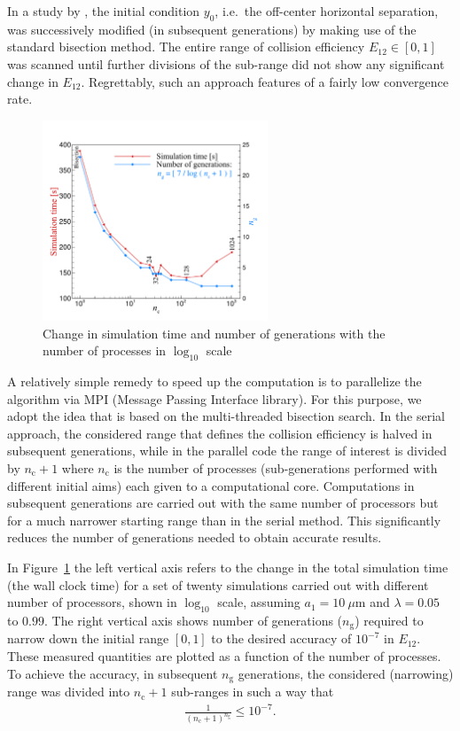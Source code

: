 \documentclass[../thesis.tex]{subfiles}
\begin{document}
In a study by \cite{RWMG11}, the initial condition $y_0$, i.e.\ the off-center horizontal separation, was successively modified (in subsequent generations) by making use of the standard bisection method. The entire range of collision efficiency $E_{12} \in [0, 1]$ was scanned until further divisions of the sub-range did not show any significant change in $E_{12}$. Regrettably, such an approach features of a fairly low convergence rate.

\begin{figure}%
\center
\includegraphics[trim=05mm 00mm 05mm 20mm, clip, width=0.6\textwidth]{../figs/PRF/fig10.pdf}
\caption{Change in simulation time and number of generations with the number of processes in $\log_{10}$ scale}
\label{fig:scal}
\end{figure}%

A relatively simple remedy to speed up the computation is to parallelize the algorithm via MPI (Message Passing Interface library). For this purpose, we adopt the idea that is based on the multi-threaded bisection search. In the serial approach, the considered range that defines the collision efficiency is halved in subsequent generations, while in the parallel code the range of interest is divided by $n_\text{c} + 1$ where $n_\text{c}$ is the number of processes (sub-generations performed with different initial aims) each given to a computational core. Computations in subsequent generations are carried out with the same number of processors but for a much narrower starting range than in the serial method. This significantly reduces the number of generations needed to obtain accurate results.

In Figure~\ref{fig:scal} the left vertical axis refers to the change in the total simulation time (the wall clock time) for a set of twenty simulations carried out with different number of processors, shown in $\log_{10}$ scale, assuming $a_1=10~\mu$m and $\lambda=0.05$ to $0.99$. The right vertical axis shows number of generations ($n_\text{g}$) required to narrow down the initial range $[0,1]$ to the desired accuracy of $10^{-7}$ in $E_{12}$. These measured quantities are plotted as a function of the number of processes. To achieve the accuracy, in subsequent $n_\text{g}$ generations, the considered (narrowing) range was divided into $n_\text{c} + 1$ sub-ranges in such a way that
\begin{eqnarray}
\frac{1}{(n_\text{c}+1)^{n_\text{g}}}\leq 10^{-7}. \nonumber
\label{eq:ng}
\end{eqnarray}
\end{document}
